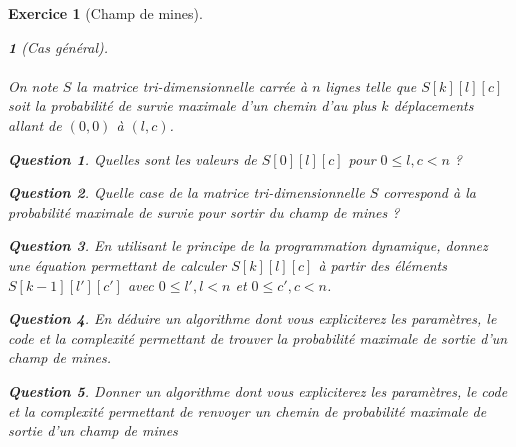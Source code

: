 \documentclass{article}
\theoremstyle{exostyle}
\newtheorem{exo}{Exercice}
\theoremstyle{partiestyle}
\newtheorem{partie}{}[exo]
\theoremstyle{questionstyle}
\newtheorem{questionpartie}{Question}[partie]
\begin{document}
\begin{exo}[Champ de mines]
\begin{partie}[Cas général]
            \paragraph{}On note $S$ la matrice tri-dimensionnelle carrée à $n$ lignes telle que $S[k][l][c]$ soit la probabilité de survie maximale d'un chemin d'au plus $k$ déplacements allant de $(0,0)$ à $(l, c)$. 
        \begin{questionpartie}
            Quelles sont les valeurs de $S[0][l][c]$ pour $0\leq l, c < n$ ?
        \end{questionpartie}
        \begin{questionpartie}
       Quelle case de la matrice tri-dimensionnelle $S$ correspond à la probabilité maximale de survie pour sortir du champ de mines ?
        \end{questionpartie}
        \begin{questionpartie}
            En utilisant le principe de la programmation dynamique, donnez une équation permettant de calculer $S[k][l][c]$ à partir des éléments $S[k-1][l'][c']$ avec $0 \leq l', l < n$ et $0 \leq c', c < n$.
        \end{questionpartie}
        \begin{questionpartie}
            En déduire un algorithme dont vous expliciterez les paramètres, le code et la complexité permettant de trouver la probabilité maximale de sortie d'un champ de mines.
        \end{questionpartie}
        \begin{questionpartie}
Donner un algorithme dont vous expliciterez les paramètres, le code et la complexité permettant de renvoyer un chemin de probabilité maximale de sortie d’un champ de mines        \end{questionpartie}

    \end{partie}
\end{exo}
\end{document}
